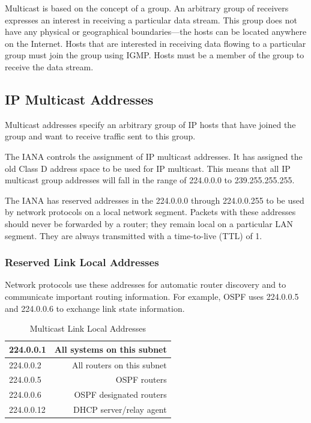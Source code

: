 \cite{cisco:multicast}
Multicast is based on the concept of a group. An arbitrary group of
receivers expresses an interest in receiving a particular data stream. This
group does not have any physical or geographical boundaries—the hosts can
be located anywhere on the Internet. Hosts that are interested in receiving
data flowing to a particular group must join the group using \ac{IGMP}.
Hosts must be a member of the group to receive the data stream.


\subsection{IP Multicast Addresses}

\cite{cisco:multicast}
Multicast addresses specify an arbitrary group of IP hosts that have joined
the group and want to receive traffic sent to this group.

The \ac{IANA}  controls the assignment of
IP multicast addresses. It has assigned the old Class D address space to be
used for IP multicast. This means that all IP multicast group addresses
will fall in the range of 224.0.0.0 to 239.255.255.255. 

The \ac{IANA} has reserved addresses in the 224.0.0.0 through 224.0.0.255
to be
used by network protocols on a local network segment. Packets with these
addresses should never be forwarded by a router; they remain local on a
particular LAN segment. They are always transmitted with a time-to-live
(\ac{TTL}) of 1.

\subsubsection{Reserved Link Local Addresses}

\cite{cisco:multicast}
Network protocols use these addresses for automatic router discovery and to
communicate important routing information. For example, OSPF uses 224.0.0.5
and 224.0.0.6 to exchange link state information. 

\begin{table}


\begin{tabular}{| l | r |}
\hline
224.0.0.1 & All systems on this subnet \\
\hline
224.0.0.2 & All routers on this subnet \\
\hline
224.0.0.5 & OSPF routers \\
\hline
224.0.0.6 & OSPF designated routers \\
\hline
224.0.0.12 & DHCP server/relay agent \\
\hline
\end{tabular}
\caption{Multicast Link Local Addresses}
\label{table:multicast_addressed}
\end{table}

